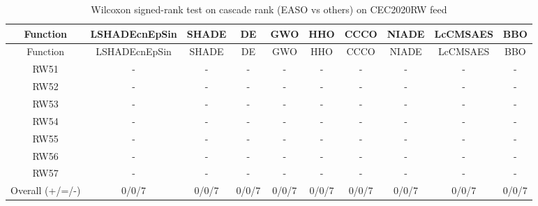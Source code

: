 \begin{center}
\small
\renewcommand{\arraystretch}{1.25}
\begin{longtable}{cccccccccc}
\caption{Wilcoxon signed-rank test on cascade rank (EASO vs others) on CEC2020RW  feed}
\label{tab:wilcoxon_cascade_CEC2020RW_feed} \\
\toprule
Function & LSHADEcnEpSin & SHADE & DE & GWO & HHO & CCCO & NIADE & LcCMSAES & BBO \\
\midrule
\endfirsthead
\toprule
Function & LSHADEcnEpSin & SHADE & DE & GWO & HHO & CCCO & NIADE & LcCMSAES & BBO \\
\midrule
\endhead
RW51 & - & - & - & - & - & - & - & - & - \\
RW52 & - & - & - & - & - & - & - & - & - \\
RW53 & - & - & - & - & - & - & - & - & - \\
RW54 & - & - & - & - & - & - & - & - & - \\
RW55 & - & - & - & - & - & - & - & - & - \\
RW56 & - & - & - & - & - & - & - & - & - \\
RW57 & - & - & - & - & - & - & - & - & - \\
\midrule
Overall (+/=/-) & 0/0/7 & 0/0/7 & 0/0/7 & 0/0/7 & 0/0/7 & 0/0/7 & 0/0/7 & 0/0/7 & 0/0/7 \\
\bottomrule
\end{longtable}
\end{center}